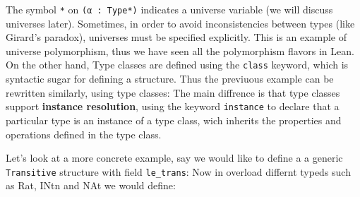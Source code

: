 
The symbol \lstinline[language=lean]|*| on  \lstinline[language=lean]|(α : Type*)| 
indicates a universe variable (we will discuss universes later). Sometimes, 
in order to avoid
inconsistencies between types (like Girard's paradox), universes must be specified explicitly. 
This is an example
of universe polymorphism, thus we have seen all the polymorphism flavors in Lean.
On the other hand, Type classes are defined using the \lstinline[language=lean]|class| keyword, 
which is syntactic sugar for defining a structure.
Thus the previuous example can be rewritten similarly, using type classes:
The main diffrence is that type classes support \textbf{instance resolution}, using the keyword 
\lstinline[language=lean]|instance| to declare that a particular type is an instance of a type class, 
wich inherits 
the properties and operations defined in the type class.

Let's look at a more concrete example, say we would like to define a a generic \lstinline[language=lean]|Transitive| 
structure with field \lstinline[language=lean]|le_trans|:
Now in overload differnt typeds such as Rat, INtn and NAt we would define:


